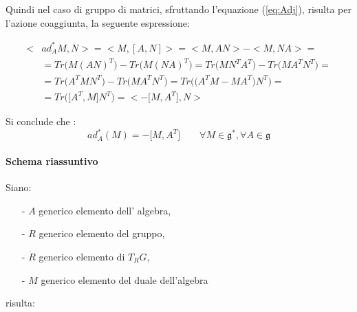 \documentclass[11pt]{report}
\theoremstyle{plain}
\theoremstyle{definition}
\theoremstyle{remark}
\begin{document}
Quindi nel caso di gruppo di matrici, sfruttando l’equazione (\ref{eq:Adj}), risulta
per l’azione coaggiunta, la seguente espressione:

\begin{displaymath}\begin{split}
<& ad_{A}^{\ast}M, N>= < M , [A, N]> = < M , A N> - < M , N A> =\\ & = Tr \Bigr( M ( A N)^{T} \Bigr) - Tr \Bigr( M (N A)^{T} \Bigr) = Tr \Bigr( M N^{T} A^{T} \Bigr) - Tr \Bigr( M A^{T} N ^{T} \Bigr)= \\ & = Tr \Bigr(  A^{T} M N^{T} \Bigr) - Tr \Bigr( M A^{T} N ^{T} \Bigr) = Tr \Bigr( \bigr( A^{T} M - M A^{T} \bigr) N ^{T} \Bigr) = \\ &= Tr \Bigr( \bigr[ A^{T}, M \bigr] N ^{T} \Bigr) = < - \bigr[ M , A^{T} \bigr]  , N >
	\end{split}\end{displaymath}

Si conclude  che :
\begin{equation}
ad_{A}^{\ast} (M) = - \bigr[M,A^{T} \bigr]  \qquad \forall M \in \mathfrak{g}^{\ast} , \forall A \in \mathfrak{g}
\end{equation}


\clearpage
\paragraph{Schema riassuntivo}
Siano:
\begin{itemize}
\item[-] $A$ generico elemento dell' algebra, 

\item[-]$R$ generico elemento del gruppo,  

\item[-]$\dot{R}$ generico elemento di $T_{R}G$,

\item[-]$M$ generico elemento del duale dell'algebra
\end{itemize}
risulta:
\end{document}

